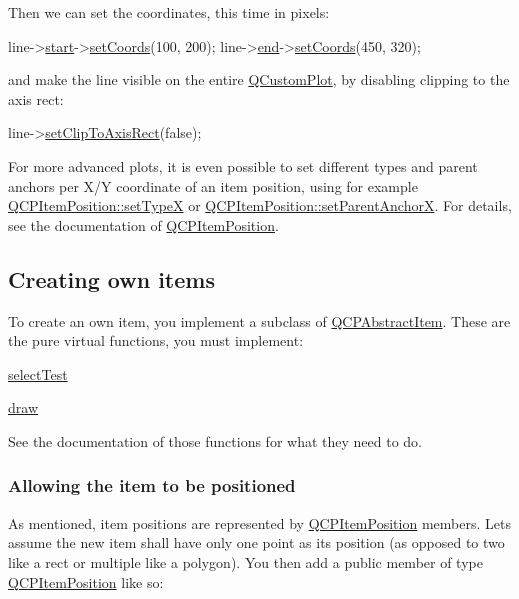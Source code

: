  Then we can set the coordinates, this time in pixels\+: 
\begin{DoxyCode}
line->\hyperlink{class_q_c_p_item_line_a602da607a09498b0f152ada1d6851bc5}{start}->\hyperlink{class_q_c_p_item_position_aa988ba4e87ab684c9021017dcaba945f}{setCoords}(100, 200);
line->\hyperlink{class_q_c_p_item_line_a15598864c1c22a2497a1979c4980c4e1}{end}->\hyperlink{class_q_c_p_item_position_aa988ba4e87ab684c9021017dcaba945f}{setCoords}(450, 320);
\end{DoxyCode}
 and make the line visible on the entire \hyperlink{class_q_custom_plot}{Q\+Custom\+Plot}, by disabling clipping to the axis rect\+: 
\begin{DoxyCode}
line->\hyperlink{class_q_c_p_abstract_item_a39e05b9d4176b9accafc746d16ca6a06}{setClipToAxisRect}(\textcolor{keyword}{false});
\end{DoxyCode}


For more advanced plots, it is even possible to set different types and parent anchors per X/\+Y coordinate of an item position, using for example \hyperlink{class_q_c_p_item_position_a2113b2351d6d00457fb3559a4e20c3ea}{Q\+C\+P\+Item\+Position\+::set\+Type\+X} or \hyperlink{class_q_c_p_item_position_add71461a973927c74e42179480916d9c}{Q\+C\+P\+Item\+Position\+::set\+Parent\+Anchor\+X}. For details, see the documentation of \hyperlink{class_q_c_p_item_position}{Q\+C\+P\+Item\+Position}.\hypertarget{class_q_c_p_abstract_item_items-subclassing}{}\subsection{Creating own items}\label{class_q_c_p_abstract_item_items-subclassing}
To create an own item, you implement a subclass of \hyperlink{class_q_c_p_abstract_item}{Q\+C\+P\+Abstract\+Item}. These are the pure virtual functions, you must implement\+: \begin{DoxyItemize}
\item \hyperlink{class_q_c_p_abstract_item_a96d522d10ffc0413b9a366c6f7f0476b}{select\+Test} \item \hyperlink{class_q_c_p_abstract_item_ad0dc056f650c3ca73414e6b4f01674ef}{draw}\end{DoxyItemize}
See the documentation of those functions for what they need to do.\hypertarget{class_q_c_p_abstract_item_items-positioning}{}\subsubsection{Allowing the item to be positioned}\label{class_q_c_p_abstract_item_items-positioning}
As mentioned, item positions are represented by \hyperlink{class_q_c_p_item_position}{Q\+C\+P\+Item\+Position} members. Let\textquotesingle{}s assume the new item shall have only one point as its position (as opposed to two like a rect or multiple like a polygon). You then add a public member of type \hyperlink{class_q_c_p_item_position}{Q\+C\+P\+Item\+Position} like so\+:



